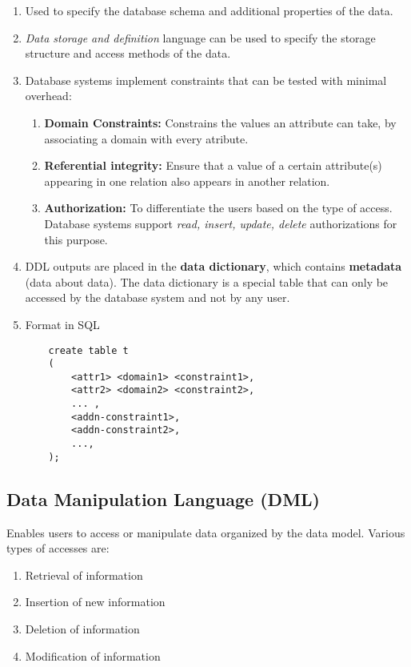 \documentclass[journal,12pt,twocolumn]{IEEEtran}
\begin{document}
\begin{enumerate}
    \item Used to specify the database schema and additional properties of the 
    data.
    \item \textit{Data storage and definition} language can be used to specify 
    the storage structure and access methods of the data.
    \item Database systems implement constraints that can be tested with 
    minimal overhead:
    \begin{enumerate}
        \item \textbf{Domain Constraints:} Constrains the values an attribute 
        can take, by associating a domain with every atribute.
        \item \textbf{Referential integrity:} Ensure that a value of a certain 
        attribute(s) appearing in one relation also appears in another relation.
        \item \textbf{Authorization:} To differentiate the users based on the 
        type of access. Database systems support \textit{read, insert, update, 
        delete} authorizations for this purpose.
    \end{enumerate}
    \item DDL outputs are placed in the \textbf{data dictionary}, which 
    contains \textbf{metadata} (data about data). The data dictionary is a 
    special table that can only be accessed by the database system and not by 
    any user.
    \item Format in SQL
 
    \begin{lstlisting}
    create table t
    ( 
        <attr1> <domain1> <constraint1>,
        <attr2> <domain2> <constraint2>,
        ... ,
        <addn-constraint1>,
        <addn-constraint2>,
        ...,
    );
    \end{lstlisting}

\end{enumerate}

\subsection{Data Manipulation Language (DML)}

Enables users to access or manipulate data organized by the data model. Various 
types of accesses are:
\begin{enumerate}
    \item Retrieval of information
    \item Insertion of new information
    \item Deletion of information
    \item Modification of information
\end{enumerate}
\end{document}
